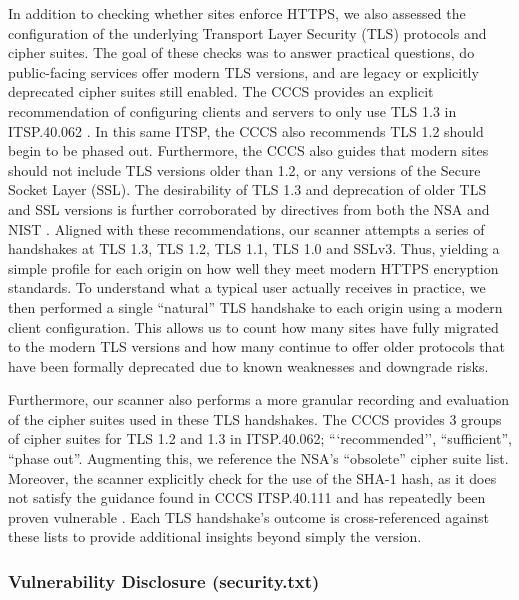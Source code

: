 \documentclass[pdflatex,sn-mathphys-num]{sn-jnl}
\numberwithin{equation}{section}
\theoremstyle{thmstyleone}
\theoremstyle{thmstyletwo}%
\theoremstyle{thmstylethree}%
\begin{document}
\vspace{1em}In addition to checking whether sites enforce HTTPS, we also assessed the configuration of the 
underlying Transport Layer Security (TLS) protocols and cipher suites.
The goal of these checks was to answer practical questions, do public-facing services offer modern TLS versions, 
and are legacy or explicitly deprecated cipher
suites still enabled. The CCCS provides an explicit recommendation of configuring clients and servers to only 
use TLS 1.3 in 
ITSP.40.062 \cite{cccs-itsap-40016}. In this same ITSP, the CCCS also recommends TLS 1.2 should begin to be phased out. Furthermore, the CCCS also guides that
modern sites should not include TLS versions older than 1.2, or any versions of the Secure Socket Layer (SSL). 
The desirability of TLS 1.3 and deprecation of older TLS and SSL versions is further corroborated by directives 
from both the NSA and NIST \cite{nist_800_52r2, nsa_eliminating_obsolete_tls}. Aligned with these recommendations, 
our scanner attempts a series of handshakes at TLS 1.3, TLS 1.2, TLS 1.1, TLS 1.0 and SSLv3. Thus, yielding a simple profile for each origin on how well they meet 
modern HTTPS encryption standards. To understand what a typical user actually receives in practice, we then
performed a single ``natural'' TLS handshake to each origin using a modern
client configuration. This allows us to count how many sites have fully migrated to the modern TLS versions and how many continue to offer older protocols that have
been formally deprecated due to known weaknesses and downgrade risks.

\vspace{1em}Furthermore, our scanner also performs a more granular recording and evaluation of the cipher suites used in these TLS handshakes. 
The CCCS provides 3 groups of cipher suites for TLS 1.2 and 1.3 in ITSP.40.062; ```recommended'', ``sufficient'', ``phase out''. Augmenting this, we
reference the NSA's ``obsolete'' cipher suite list. Moreover, the scanner explicitly check for the use of the SHA-1 hash, as it does not satisfy the guidance found
in CCCS ITSP.40.111 \cite{cccs_itsp_40_111} and has repeatedly been proven vulnerable \cite{leurent2020shambles, polk2011sha, stevens2017firstsha1collision}. 
Each TLS handshake's outcome is cross-referenced against these lists to provide additional insights beyond simply the version.  

\subsubsection{Vulnerability Disclosure (security.txt)}
\end{document}

